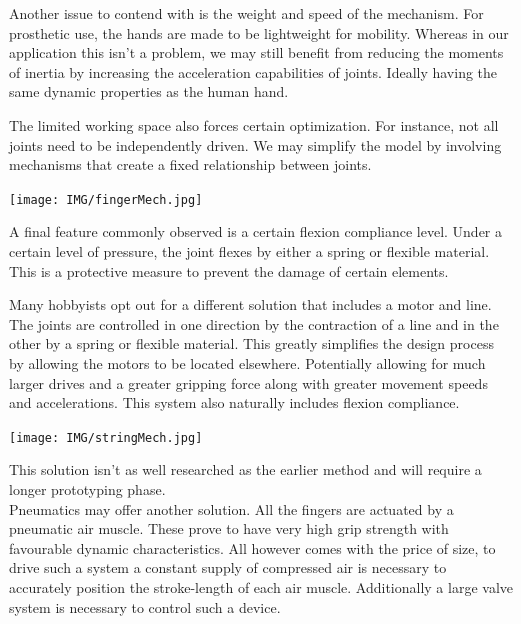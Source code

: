 \documentclass{article}
\begin{document}
Another issue to contend with is the weight and speed of the mechanism. For prosthetic use, the hands are made to be lightweight for mobility. Whereas in our application this isn't a problem, we may still benefit from reducing the moments of inertia by increasing the acceleration capabilities of joints. Ideally having the same dynamic properties as the human hand.

The limited working space also forces certain optimization. For instance, not all joints need to be independently driven. We may simplify the model by involving mechanisms that create a fixed relationship between joints.

\begin{center}
\texttt{[image: IMG/fingerMech.jpg]}
\end{center}

A final feature commonly observed is a certain flexion compliance level. Under a certain level of pressure, the joint flexes by either a spring or flexible material. This is a protective measure to prevent the damage of certain elements.

Many hobbyists opt out for a different solution that includes a motor and line. The joints are controlled in one direction by the contraction of a line and in the other by a spring or flexible material. This greatly simplifies the design process by allowing the motors to be located elsewhere. Potentially allowing for much larger drives and a greater gripping force along with greater movement speeds and accelerations. This system also naturally includes flexion compliance.

\begin{center}
\texttt{[image: IMG/stringMech.jpg]}
\end{center}

This solution isn't as well researched as the earlier method and will require a longer prototyping phase. \\[12pt]
\indent Pneumatics may offer another solution. All the fingers are actuated by a pneumatic air muscle. These prove to have very high grip strength with favourable dynamic characteristics. All however comes with the price of size, to drive such a system a constant supply of compressed air is necessary to accurately position the stroke-length of each air muscle. Additionally a large valve system is necessary to control such a device.
\end{document}
